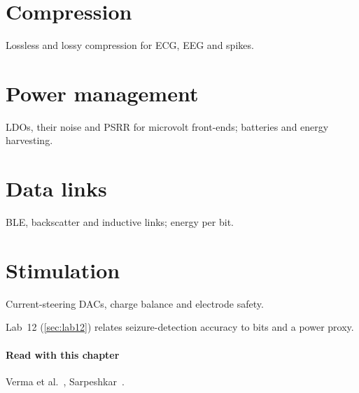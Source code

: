 \section{Compression}\label{sec:ch27-3}
Lossless and lossy compression for ECG, EEG and spikes.

\section{Power management}\label{sec:ch27-4}
LDOs, their noise and PSRR for microvolt front-ends; batteries and energy harvesting.

\section{Data links}\label{sec:ch27-5}
BLE, backscatter and inductive links; energy per bit.

\section{Stimulation}\label{sec:ch27-6}
Current-steering DACs, charge balance and electrode safety.

\begin{tryit}
Lab~12 (\cref{sec:lab12}) relates seizure-detection accuracy to bits and a power proxy.
\end{tryit}

\paragraph{Read with this chapter} Verma et al.~\cite{verma2010}, Sarpeshkar~\cite{sarpeshkar}.
